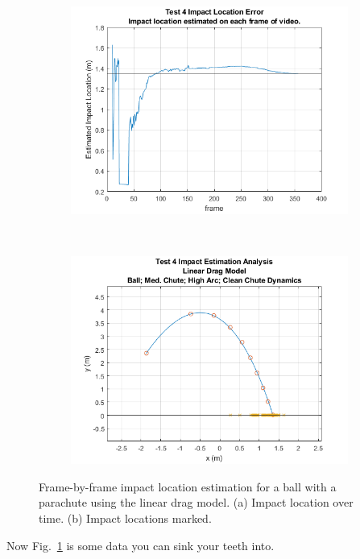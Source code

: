 \begin{figure}[t!]
    \centering
    \begin{subfigure}[t]{0.5\textwidth}
        \centering
        \includegraphics[width=\textwidth]{images/Analysis2_Test4_ImpLocPlot_LinearDrag.png}
        \caption{}
    \end{subfigure}%
    ~ 
    \begin{subfigure}[t]{0.5\textwidth}
        \centering
        \includegraphics[width=\textwidth]{images/Analysis2_Test4_ImpLocHist_LinearDrag.png}
        \caption{}
    \end{subfigure}
    \caption{\label{fig:Test4_LinearDrag_FrameByFrame} Frame-by-frame impact location estimation for a ball with a parachute using the linear drag model. (a) Impact location over time. (b) Impact locations marked.}
\end{figure}

Now Fig.~\ref{fig:Test4_LinearDrag_FrameByFrame} is some data you can sink your teeth into. 